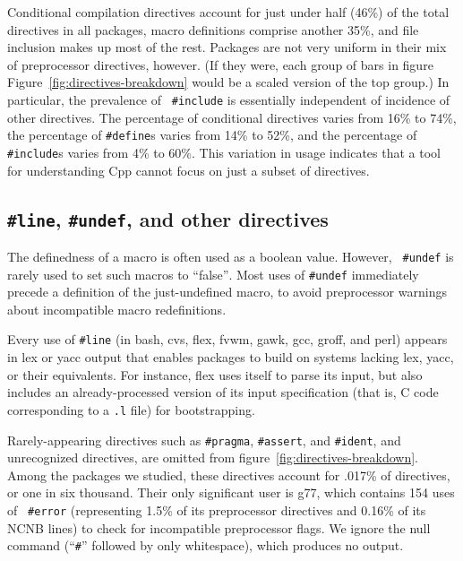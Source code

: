\documentclass[10pt]{article}
\newcommand{\pkg}[1]{\textsf{#1}}
\begin{document}
Conditional compilation directives account for just under half (46\%) of
the total directives in all packages, macro definitions comprise another
35\%, and file inclusion makes up most of the rest.  Packages are not very
uniform in their mix of preprocessor directives, however.  (If they were,
each group of bars in figure Figure~\ref{fig:directives-breakdown} would be
a scaled version of the top group.)  In particular, the prevalence of {\tt
\#include} is essentially independent of incidence of other directives.
The percentage of conditional directives varies from 16\% to 74\%, the
percentage of {\tt \#define}s varies from 14\% to 52\%, and the percentage
of {\tt \#include}s varies from 4\% to 60\%.  This variation in usage
indicates that a tool for understanding Cpp cannot focus on just a subset
of directives.  


\subsection{{\tt \#line}, {\tt \#undef}, and other directives}

The definedness of a macro is often used as a boolean value.  However, {\tt
\#undef} is rarely used to set such macros to ``false''$\!$.  Most uses of
{\tt \#undef} immediately precede a definition of the just-undefined macro,
to avoid preprocessor warnings about incompatible macro redefinitions.

Every use of {\tt \#line} (in \pkg{bash}, \pkg{cvs}, \pkg{flex}, \pkg{fvwm},
\pkg{gawk}, \pkg{gcc}, \pkg{groff}, and \pkg{perl}) appears in lex or yacc
output that enables packages to build on systems lacking lex, yacc, or
their equivalents.  For instance, \pkg{flex} uses itself to parse its
input, but also includes an already-processed version of its input
specification (that is, C code corresponding to a {\tt .l} file) for
bootstrapping.


Rarely-appearing directives such as {\tt \#pragma}, {\tt \#assert}, and
{\tt \#ident}, and unrecognized directives, are omitted from
figure~\ref{fig:directives-breakdown}.  Among the packages we studied,
these directives account for .017\% of directives, or one in six thousand.
Their only significant user is \pkg{g77}, which contains 154 uses of {\tt
\#error} (representing 1.5\% of its preprocessor directives and 0.16\% of
its NCNB lines) to check for incompatible preprocessor flags.  We ignore
the null command (``{\tt \#}'' followed by only whitespace), which produces
no output.
\end{document}
